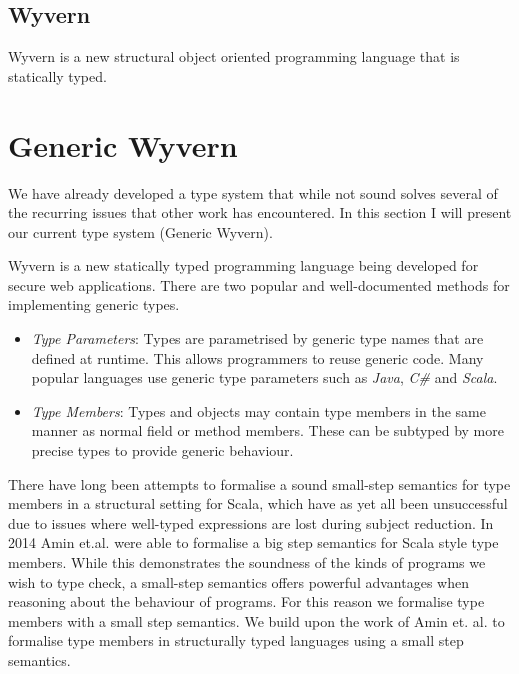 \documentclass[11pt
              , a4paper
              , twoside
              , openright
              ]{report}
\numberwithin{case}{theorem}
\numberwithin{subcase}{case}
\begin{document}
\section{Wyvern}
Wyvern is a new structural object oriented programming language that is statically typed. 



\chapter{Generic Wyvern}\label{ch:wyvern}

We have already developed a type system that while not sound solves several of the recurring issues that other work has encountered. In this section I will present our current type system (Generic Wyvern).

Wyvern is a new statically typed programming language being developed for secure web applications. There are two popular and well-documented methods \cite{Virtual Types stuff, generic java etc} for implementing generic types.
\begin{itemize}
\item \emph{Type Parameters}: Types are parametrised by generic type names that are defined at runtime. This allows programmers to reuse generic code. Many popular languages use generic type parameters such as \emph{Java}, \emph{C\#} and \emph{Scala}.
\item \emph{Type Members}: Types and objects may contain type members in the same manner as normal field or method members. These can be subtyped by more precise types to provide generic behaviour.
\end{itemize}
There have long been attempts to formalise a sound small-step semantics for type members in a structural setting for Scala, which have as yet all been unsuccessful due to issues where well-typed expressions are lost during subject reduction. In 2014 Amin et.al. were able to formalise a big step semantics for Scala style type members. While this demonstrates the soundness of the kinds of programs we wish to type check, a small-step semantics offers powerful advantages when reasoning about the behaviour of programs. For this reason we formalise type members with a small step semantics.
We build upon the work of Amin et. al. \cite{Scala stuff} to formalise type members in structurally typed languages using a small step semantics. 
\end{document}
